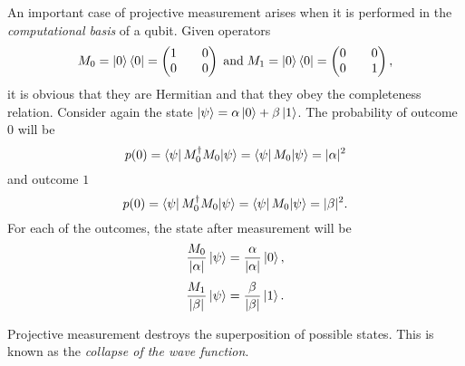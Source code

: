 \documentclass[../../../dissertation.tex]{subfiles}
\begin{document}
An important case of projective measurement arises when it is performed in the
\textit{computational basis} of a qubit. Given operators 
\begin{equation}
	M_0 = \ket{0}\bra{0} = \begin{pmatrix}
				1 && 0\\
				0 && 0
				\end{pmatrix}
	\;
	\text{and}
	\;
	M_1 = \ket{0}\bra{0} = \begin{pmatrix}
				0 && 0\\
				0 && 1
				\end{pmatrix},
\end{equation}
it is obvious that they are Hermitian and that they obey the completeness
relation. Consider again the state $\ket{\psi}=\alpha\ket{0} + \beta\ket{1}$.
The probability of outcome $0$ will be 
\begin{equation}
	p(0) = \bra{\psi}M_0^\dag M_0{\ket{\psi}} = \bra{\psi}M_0{\ket{\psi}} = |\alpha|^2
\end{equation}
and outcome $1$
\begin{equation}
	p(0) = \bra{\psi}M_0^\dag M_0{\ket{\psi}} = \bra{\psi}M_0{\ket{\psi}} = |\beta|^2.
\end{equation}
For each of the outcomes, the state after measurement will be
\begin{equation} 
	\frac{M_0}{|\alpha|} \ket{\psi} = \frac{\alpha}{|\alpha|} \ket{0},
\end{equation}
\begin{equation} 
	\frac{M_1}{|\beta|} \ket{\psi} = \frac{\beta}{|\beta|} \ket{1}.
\end{equation}\par
Projective measurement destroys the superposition of possible
states. This is known as the \textit{collapse of the wave function}. 
\end{document}
